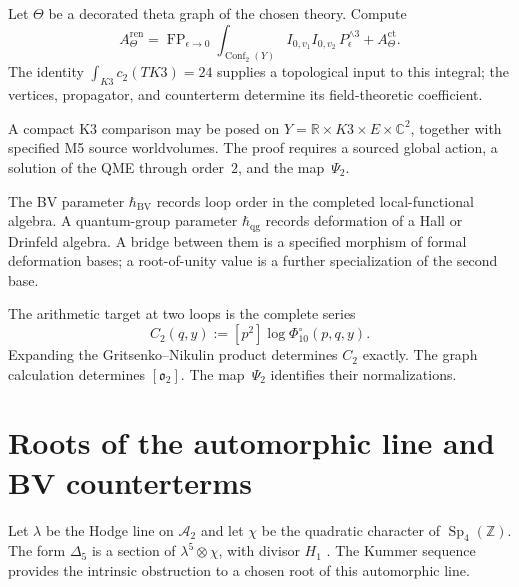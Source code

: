 \begin{problem}
\label{rem:bvbrst-theta-graph}
Let $\Theta$ be a decorated theta graph of the chosen theory.  Compute
\[
 A_\Theta^{\mathrm{ren}}
 =\operatorname{FP}_{\epsilon\to0}
 \int_{\operatorname{Conf}_2(Y)}
 I_{0,v_1}I_{0,v_2}\,
 P_{\epsilon}^{\wedge3}
 +A_\Theta^{\mathrm{ct}}.
\]
The identity $\int_{K3}c_2(TK3)=24$ supplies a topological input to
this integral; the vertices, propagator, and counterterm determine its
field-theoretic coefficient.
\end{problem}

\begin{remark}
\label{rem:bvbrst-scope}
A compact K3 comparison may be posed on
$Y=\mathbb R\times K3\times E\times\mathbb C^2$, together with
specified M5 source worldvolumes.  The proof requires a sourced global
action, a solution of the QME through order~$2$, and the map~$\Psi_2$.
\end{remark}

\begin{remark}
\label{rem:bvbrst-two-hbar}
The BV parameter $\hbar_{\mathrm{BV}}$ records loop order in the
completed local-functional algebra.  A quantum-group parameter
$\hbar_{\mathrm{qg}}$ records deformation of a Hall or Drinfeld
algebra.  A bridge between them is a specified morphism of formal
deformation bases; a root-of-unity value is a further specialization
of the second base.
\end{remark}

\begin{remark}
\label{rem:bvbrst-partition-match}
The arithmetic target at two loops is the complete series
\[
 C_2(q,y):=[p^2]\log\Phi_{10}^{\circ}(p,q,y).
\]
Expanding the Gritsenko--Nikulin product determines $C_2$ exactly.
The graph calculation determines $[\mathfrak o_2]$.  The map~$\Psi_2$
identifies their normalizations.
\end{remark}

\section{Roots of the automorphic line and BV counterterms}
\label{sec:bvbrst-supplement-iii}

Let $\lambda$ be the Hodge line on $\mathcal A_2$ and let $\chi$ be
the quadratic character of $\operatorname{Sp}_4(\mathbb Z)$.  The
form $\Delta _5$ is a section of $\lambda^5\otimes\chi$, with divisor
$H_1$ \cite{GN96Igusa}.  The Kummer sequence provides the intrinsic
obstruction to a chosen root of this automorphic line.

